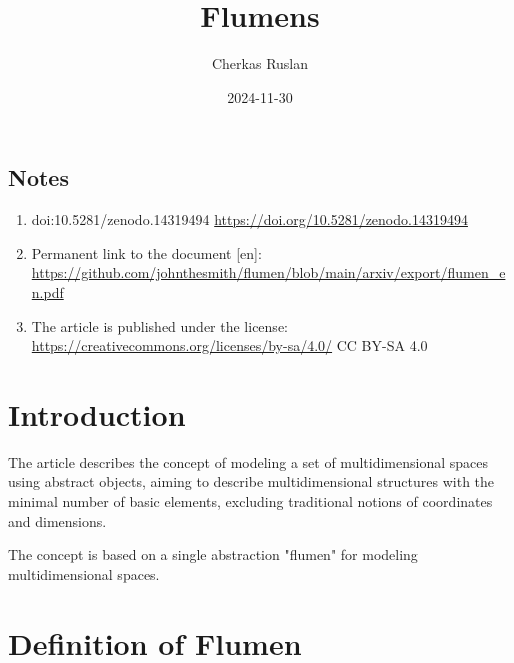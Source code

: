 \documentclass[final]{article}
\begin{document}
    \title{Flumens}
    \author{Cherkas Ruslan}
    \date{2024-11-30}

    \begin{small}
        \begingroup
        \renewcommand{\baselinestretch}{0.8}

        \renewcommand{\contentsname}{Contents}
        \maketitle
        \tableofcontents
        
        \section*{Notes}
            \begin{enumerate}
                \item doi:10.5281/zenodo.14319494
                \url{https://doi.org/10.5281/zenodo.14319494}

                \item Permanent link to the document [en]:
                \url{https://github.com/johnthesmith/flumen/blob/main/arxiv/export/flumen_en.pdf}
            
                \item The article is published under the license:
                \url{https://creativecommons.org/licenses/by-sa/4.0/} CC BY-SA 4.0
            \end{enumerate}
        \endgroup
    \end{small}

    \section{Introduction}

        The article describes the concept of modeling a set of multidimensional 
        spaces using abstract objects, aiming to describe multidimensional 
        structures with the minimal number of basic elements, excluding 
        traditional notions of coordinates and dimensions.

        The concept is based on a single abstraction "flumen" for modeling 
        multidimensional spaces.

    \section{Definition of Flumen}
\end{document}
